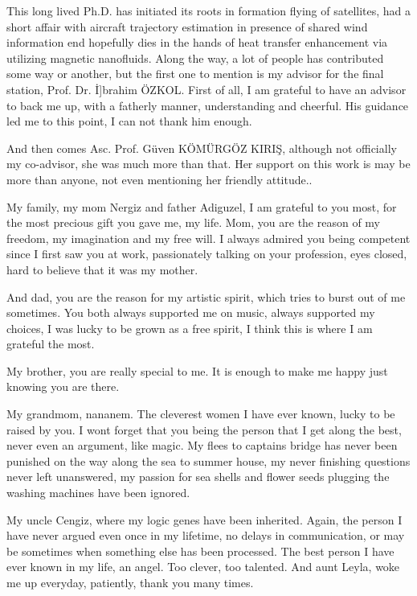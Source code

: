 
This long lived Ph.D. has initiated its roots in formation flying of satellites, had a short affair with aircraft trajectory estimation in presence of shared wind information end hopefully dies in the hands of heat transfer enhancement via utilizing magnetic nanofluids.  
Along the way, a lot of people has contributed some way or another, but the first one to mention is my advisor for the final station, Prof. Dr.  \.{I]}brahim \"{O}ZKOL. First of all, I am grateful to have an advisor to back me up, with a fatherly manner, understanding and cheerful. His guidance led me to this point, I can not thank him enough. 

And then comes Asc. Prof. G\"uven K\"{O}M\"URG\"{O}Z KIRI\c{S}, although not officially my co-advisor, she was much more than that. Her support on this work is may be more than anyone, not even mentioning her friendly attitude.. 

My family, my mom Nergiz and father Adiguzel, I am grateful to you most, for the most precious gift you gave me, my life. Mom, you are the reason of my freedom, my imagination and my free will. I always admired you being competent since I first saw you at work, passionately talking on your profession, eyes closed, hard to believe that it was my mother. 

And dad, you are the reason for my artistic spirit, which tries to burst out of me sometimes. You both always supported me on music, always supported my choices, I was lucky to be grown as a free spirit, I think this is where I am grateful the most. 

My brother, you are really special to me. It is enough to make me happy just knowing you are there.

My grandmom, nananem. The cleverest women I have ever known, lucky to be raised by you. I wont forget that you being the person that I get along the best, never even an argument, like magic. My flees to captains bridge has never been punished on the way along the sea to summer house, my never finishing questions never left unanswered, my passion for sea shells and flower seeds plugging the washing machines have been ignored. 

My uncle Cengiz, where my logic genes have been inherited. Again, the person I have never argued even once in my lifetime, no delays in communication, or may be sometimes when something else has been processed. The best person I have ever known in my life, an angel. Too clever, too talented. And aunt Leyla, woke me up everyday, patiently, thank you many times.

